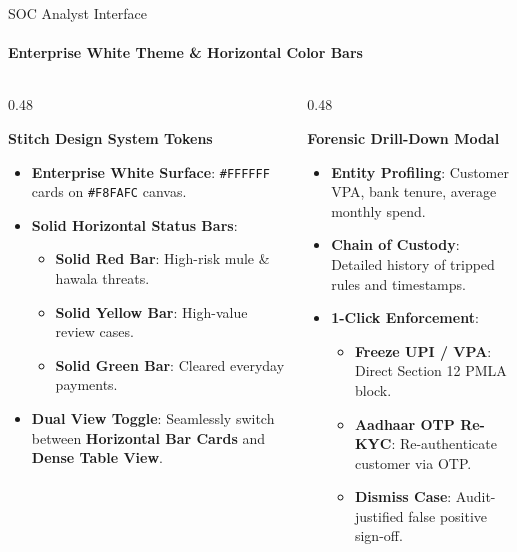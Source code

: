 \documentclass[aspectratio=169,10pt]{beamer}
\begin{document}
\begin{frame}{SOC Analyst Interface}
  \framesubtitle{Enterprise White Theme \& Horizontal Color Bars}
  \begin{columns}[t]
    \begin{column}{0.48\textwidth}
      \begin{block}{\textbf{Stitch Design System Tokens}}
        \begin{itemize}
          \item \textbf{Enterprise White Surface}: \texttt{\#FFFFFF} cards on \texttt{\#F8FAFC} canvas.
          \item \textbf{Solid Horizontal Status Bars}:
          \begin{itemize}
            \item \textcolor{statusRed}{\textbf{Solid Red Bar}}: High-risk mule \& hawala threats.
            \item \textcolor{statusYellow}{\textbf{Solid Yellow Bar}}: High-value review cases.
            \item \textcolor{statusGreen}{\textbf{Solid Green Bar}}: Cleared everyday payments.
          \end{itemize}
          \item \textbf{Dual View Toggle}: Seamlessly switch between \textbf{Horizontal Bar Cards} and \textbf{Dense Table View}.
        \end{itemize}
      \end{block}
    \end{column}

    \begin{column}{0.48\textwidth}
      \begin{block}{\textbf{Forensic Drill-Down Modal}}
        \begin{itemize}
          \item \textbf{Entity Profiling}: Customer VPA, bank tenure, average monthly spend.
          \item \textbf{Chain of Custody}: Detailed history of tripped rules and timestamps.
          \item \textbf{1-Click Enforcement}:
          \begin{itemize}
            \item \textbf{Freeze UPI / VPA}: Direct Section 12 PMLA block.
            \item \textbf{Aadhaar OTP Re-KYC}: Re-authenticate customer via OTP.
            \item \textbf{Dismiss Case}: Audit-justified false positive sign-off.
          \end{itemize}
        \end{itemize}
      \end{block}
    \end{column}
  \end{columns}
\end{frame}
\end{document}
